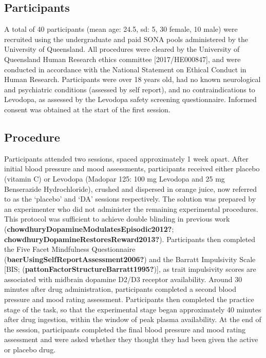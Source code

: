 \documentclass{article}
\begin{document}
\label{sec:Methods}

\hypertarget{participants}{%
\subsection{Participants}\label{participants}}

A total of 40 participants (mean age: 24.5, sd: 5, 30 female, 10 male)
were recruited using the undergraduate and paid SONA pools administered
by the University of Queensland. All procedures were cleared by the
University of Queensland Human Research ethics committee
{[}2017/HE000847{]}, and were conducted in accordance with the National
Statement on Ethical Conduct in Human Research. Participants were over
18 years old, had no known neurological and psychiatric conditions
(assessed by self report), and no contraindications to Levodopa, as
assessed by the Levodopa safety screening questionnaire. Informed
consent was obtained at the start of the first session.

\hypertarget{procedure}{%
\subsection{Procedure}\label{procedure}}

Participants attended two sessions, spaced approximately 1 week apart.
After initial blood pressure and mood assessments, participants received
either placebo (vitamin C) or Levodopa (Madopar 125: 100 mg Levodopa and
25 mg Benserazide Hydrochloride), crushed and dispersed in orange juice,
now referred to as the `placebo' and `DA' sessions respectively. The
solution was prepared by an experimenter who did not administer the
remaining experimental procedures. This protocol was sufficient to
achieve double blinding in previous work
(\textbf{chowdhuryDopamineModulatesEpisodic2012?};
\textbf{chowdhuryDopamineRestoresReward2013?}). Participants then
completed the Five Facet Mindfulness Questionnaire
(\textbf{baerUsingSelfReportAssessment2006?}) and the Barratt
Impulsivity Scale {[}BIS;
(\textbf{pattonFactorStructureBarratt1995?}){]}, as trait impulsivity
scores are associated with midbrain dopamine D2/D3 receptor
availability. Around 30 minutes after drug administration, participants
completed a second blood pressure and mood rating assessment.
Participants then completed the practice stage of the task, so that the
experimental stage began approximately 40 minutes after drug ingestion,
within the window of peak plasma availability. At the end of the
session, participants completed the final blood pressure and mood rating
assessment and were asked whether they thought they had been given the
active or placebo drug.
\end{document}

